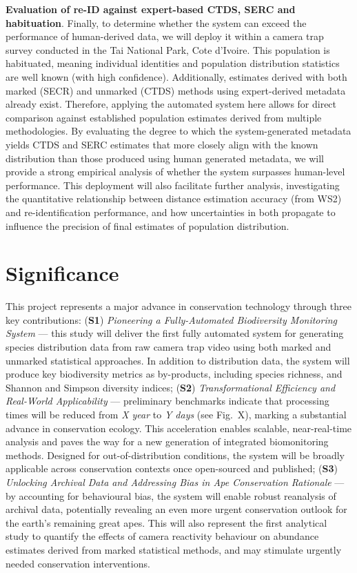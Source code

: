\documentclass{article}
\begin{document}
\textbf{Evaluation of re-ID against expert-based CTDS, SERC and habituation}. Finally, to determine whether the system can exceed the performance of human-derived data, we will deploy it within a camera trap survey conducted in the Tai National Park, Cote d’Ivoire. This population is habituated,
meaning individual identities and population distribution statistics are well known (with high confidence). Additionally, estimates derived with both marked (SECR) and unmarked (CTDS) methods using expert-derived metadata already exist. Therefore, applying the automated system here allows for direct comparison against established population estimates derived from multiple methodologies. By evaluating the degree to which the system-generated metadata yields CTDS and SERC estimates that more closely align with the known distribution than those produced using human generated metadata, we will provide a strong empirical analysis of whether the system surpasses human-level performance. This deployment will also facilitate further analysis, investigating the quantitative relationship between distance estimation accuracy (from WS2) and re-identification performance, and how uncertainties in both propagate to influence the precision of final estimates of population distribution.

\section{Significance}

This project represents a major advance in conservation technology through three key contributions:
(\textbf{S1}) \textit{Pioneering a Fully-Automated Biodiversity Monitoring System} — this study will deliver the first fully automated system for generating species distribution data from raw camera trap video using both marked and unmarked statistical approaches. In addition to distribution data, the system will produce key biodiversity metrics as by-products, including species richness, and Shannon and Simpson diversity indices;
(\textbf{S2}) \textit{Transformational Efficiency and Real-World Applicability} — preliminary benchmarks indicate that processing times will be reduced from \textit{X year} to \textit{Y days} (see Fig.~X), marking a substantial advance in conservation ecology. This acceleration enables scalable, near-real-time analysis and paves the way for a new generation of integrated biomonitoring methods. Designed for out-of-distribution conditions, the system will be broadly applicable across conservation contexts once open-sourced and published;
(\textbf{S3}) \textit{Unlocking Archival Data and Addressing Bias in Ape Conservation Rationale} — by accounting for behavioural bias, the system will enable robust reanalysis of archival data, potentially revealing an even more urgent conservation outlook for the earth’s remaining great apes. This will also represent the first analytical study to quantify the effects of camera reactivity behaviour on abundance estimates derived from marked statistical methods, and may stimulate urgently needed conservation interventions.



\end{document}
